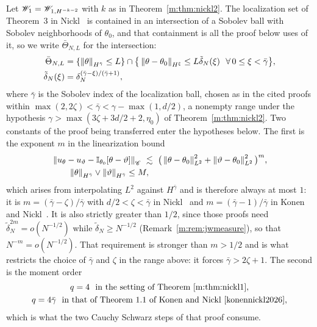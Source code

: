 Let $\mathscr{W}_1=\mathscr{W}_{1,H^{-k-2}}$ with $k$ as in Theorem~\ref{m:thm:nickl2}. The localization set of Theorem~3 in Nickl~\cite{nicklbvm2024} is contained in an intersection of a Sobolev ball with Sobolev neighborhoods of $\theta_0$, and that containment is all the proof below uses of it, so we write $\bar\Theta_{N,L}$ for the intersection:
\begin{equation}\label{m:eq:locset}
\begin{aligned}
\bar\Theta_{N,L}&=\{\norm\theta_{H^{\bar\gamma}}\le L\}\cap\big\{\norm{\theta-\theta_0}_{H^\xi}\le L\tilde\delta_N(\xi)\ \ \forall\,0\le\xi<\bar\gamma\big\},\\
\tilde\delta_N(\xi)&=\delta_N^{(\bar\gamma-\xi)/(\bar\gamma+1)},
\end{aligned}
\end{equation}
where $\bar\gamma$ is the Sobolev index of the localization ball, chosen as in the cited proofs within $\max(2,2\zeta)<\bar\gamma<\gamma-\max(1,d/2)$, a nonempty range under the hypothesis $\gamma>\max(3\zeta+3d/2+2,\eta_0)$ of Theorem~\ref{m:thm:nickl2}. Two constants of the proof being transferred enter the hypotheses below. The first is the exponent $m$ in the linearization bound
\begin{equation}\label{m:eq:interpm}
\begin{aligned}
&\norm{u_\theta-u_\vartheta-\I_{\theta_0}[\theta-\vartheta]}_\Ccal\ \lesssim\ \big(\norm{\theta-\theta_0}^2_{L^2}+\norm{\vartheta-\theta_0}^2_{L^2}\big)^m,\\
&\qquad \norm\theta_{H^{\bar\gamma}}\vee\norm\vartheta_{H^{\bar\gamma}}\le M ,
\end{aligned}
\end{equation}
which arises from interpolating $L^2$ against $H^{\bar\gamma}$ and is therefore always at most $1$: it is $m=(\bar\gamma-\zeta)/\bar\gamma$ with $d/2<\zeta<\bar\gamma$ in Nickl~\cite{nicklbvm2024} and $m=(\bar\gamma-1)/\bar\gamma$ in Konen and Nickl~\cite{konennickl2026}. It is also strictly greater than $1/2$, since those proofs need $\tilde\delta_N^{2m}=o(N^{-1/2})$ while $\tilde\delta_N\ge N^{-1/2}$ (Remark~\ref{m:rem:jwmeasure}), so that $N^{-m}=o(N^{-1/2})$. That requirement is stronger than $m>1/2$ and is what restricts the choice of $\bar\gamma$ and $\zeta$ in the range above: it forces $\bar\gamma>2\zeta+1$. The second is the moment order
\begin{equation}\label{m:eq:qorder}
\begin{gathered}
q=4\ \ \text{in the setting of Theorem~\ref{m:thm:nickl1}},\\
q=4\bar\gamma\ \ \text{in that of Theorem~1.1 of Konen and Nickl~\cite{konennickl2026}},
\end{gathered}
\end{equation}
which is what the two Cauchy Schwarz steps of that proof consume.

